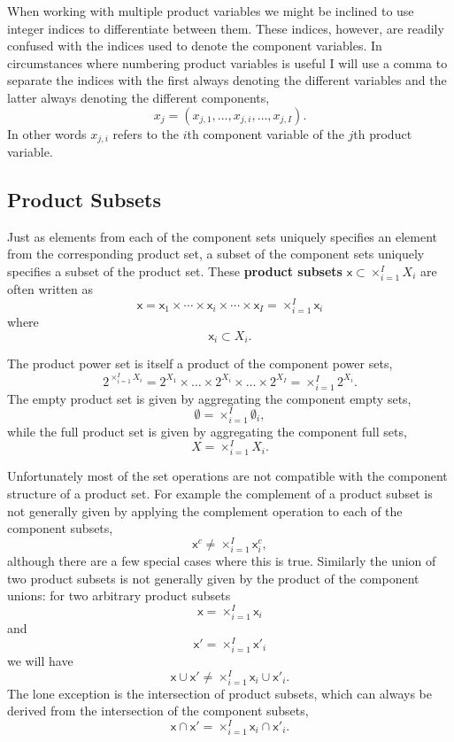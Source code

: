 \documentclass[
  letterpaper,
  DIV=11,
  numbers=noendperiod]{scrartcl}
\begin{document}
When working with multiple product variables we might be inclined to use
integer indices to differentiate between them. These indices, however,
are readily confused with the indices used to denote the component
variables. In circumstances where numbering product variables is useful
I will use a comma to separate the indices with the first always
denoting the different variables and the latter always denoting the
different components, \[
x_{j} = ( x_{j, 1}, \ldots, x_{j, i}, \ldots, x_{j, I}).
\] In other words \(x_{j, i}\) refers to the \(i\)th component variable
of the \(j\)th product variable.

\hypertarget{product-subsets}{%
\subsection{Product Subsets}\label{product-subsets}}

Just as elements from each of the component sets uniquely specifies an
element from the corresponding product set, a subset of the component
sets uniquely specifies a subset of the product set. These
\textbf{product subsets} \(\mathsf{x} \subset \times_{i = 1}^{I} X_{i}\)
are often written as \[
\mathsf{x}
=
\mathsf{x}_{1} \times \cdots \times
\mathsf{x}_{i} \times \cdots \times
\mathsf{x}_{I}
=
\times_{i = 1}^{I} \mathsf{x}_{i}
\] where \[
\mathsf{x}_{i} \subset X_{i}.
\]

The product power set is itself a product of the component power sets,
\[
2^{ \times_{i = 1}^{I} X_{i} }
=
2^{X_{1}} \times \ldots \times 2^{X_{i}} \times \ldots \times 2^{X_{I}}
=
\times_{i = 1}^{I} 2^{X_{i}}.
\] The empty product set is given by aggregating the component empty
sets, \[
\emptyset = \times_{i = 1}^{I} \emptyset_{i},
\] while the full product set is given by aggregating the component full
sets, \[
X = \times_{i = 1}^{I} X_{i}.
\]

Unfortunately most of the set operations are not compatible with the
component structure of a product set. For example the complement of a
product subset is not generally given by applying the complement
operation to each of the component subsets, \[
\mathsf{x}^{c} \ne \times_{i = 1}^{I} \mathsf{x}_{i}^{c},
\] although there are a few special cases where this is true. Similarly
the union of two product subsets is not generally given by the product
of the component unions: for two arbitrary product subsets \[
\mathsf{x} = \times_{i = 1}^{I} \mathsf{x}_{i}
\] and \[
\mathsf{x}' = \times_{i = 1}^{I} \mathsf{x}'_{i}
\] we will have \[
\mathsf{x} \cup \mathsf{x}'
\ne
\times_{i = 1}^{I} \mathsf{x}_{i} \cup \mathsf{x}'_{i}.
\] The lone exception is the intersection of product subsets, which can
always be derived from the intersection of the component subsets, \[
\mathsf{x} \cap \mathsf{x}'
=
\times_{i = 1}^{I} \mathsf{x}_{i} \cap \mathsf{x}'_{i}.
\]
\end{document}
